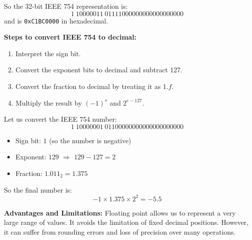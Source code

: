 \documentclass[12pt]{book}
\begin{document}
\begin{itemize}
\begin{example}
So the 32-bit IEEE 754 representation is:
\[
\boxed{1~10000011~01111000000000000000000}
\]
and is \texttt{0xC1BC0000} in hexadecimal.
\end{example}

\medskip
\textbf{Steps to convert IEEE 754 to decimal:}
\begin{enumerate}
    \item Interpret the sign bit.
    \item Convert the exponent bits to decimal and subtract 127.
    \item Convert the fraction to decimal by treating it as $1.f$.
    \item Multiply the result by $(-1)^s$ and $2^{e - 127}$.
\end{enumerate}

\begin{example}
Let us convert the IEEE 754 number:
\[
1~10000001~01100000000000000000000
\]
\begin{itemize}
    \item Sign bit: $1$ (so the number is negative)
    \item Exponent: $129$ $\Rightarrow$ $129 - 127 = 2$
    \item Fraction: $1.011_2 = 1.375$
\end{itemize}
So the final number is:
\[
-1 \times 1.375 \times 2^2 = -5.5
\]
\end{example}

\medskip
\textbf{Advantages and Limitations:} Floating point allows us to represent a very large range of values. It avoids the limitation of fixed decimal positions. However, it can suffer from rounding errors and loss of precision over many operations.


\end{itemize}
\end{document}
